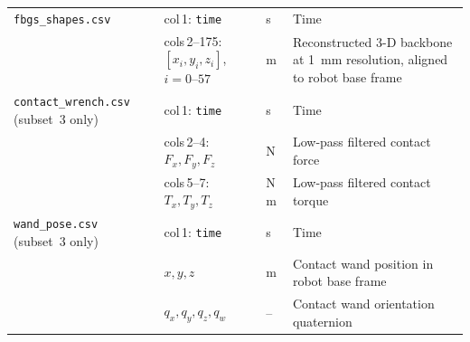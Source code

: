 \documentclass[14pt, a4paper]{article}
\begin{document}
\begin{longtable}{@{} p{3.8cm} p{4.8cm} p{1.2cm} p{5.6cm} @{}}
  \hline
\texttt{fbgs\_shapes.csv}
  & col\,1: \texttt{time}                    & s     & Time \\
  & cols\,2--175: $[x_i,y_i,z_i]$, $i=0$--$57$ & m & Reconstructed 3-D backbone at \SI{1}{\milli\meter} resolution, aligned to robot base frame \\[4pt]
  \hline
\texttt{contact\_wrench.csv} \newline (subset~3 only)
  & col\,1: \texttt{time}                    & s     & Time \\
  & cols\,2--4: $F_x, F_y, F_z$             & N     & Low-pass filtered contact force \\
  & cols\,5--7: $T_x, T_y, T_z$             & N\,m  & Low-pass filtered contact torque \\[4pt]
\texttt{wand\_pose.csv} \newline (subset~3 only)
  & col\,1: \texttt{time}                    & s     & Time \\
  & $x, y, z$                               & m     & Contact wand position in robot base frame \\
  & $q_x, q_y, q_z, q_w$                   & --    & Contact wand orientation quaternion \\[4pt]
\end{longtable}
\end{document}
